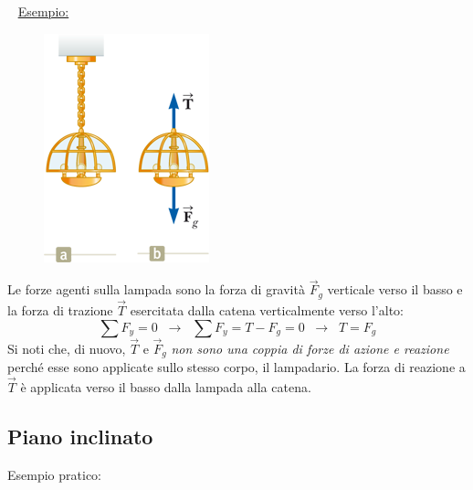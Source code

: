 \documentclass[12pt,oneside]{book}
\begin{document}
~\newline
\underline{Esempio: }
\begin{figure}[h]
    \centering
    \includegraphics[scale=1]{lampada_in_equilibrio}
\end{figure}
Le forze agenti sulla lampada sono la forza di gravità $\vec{F}_g$ verticale verso il basso e la forza di trazione $\vec{T}$ esercitata dalla catena verticalmente verso l'alto:
\begin{equation*}
    \sum F_y = 0 \;\; \rightarrow \;\; \sum F_y = T - F_g = 0 \;\; \rightarrow \;\; T = F_g
\end{equation*}
Si noti che, di nuovo, $\vec{T}$ e $\vec{F}_g$ \emph{non sono una coppia di forze di azione e reazione} perché esse sono applicate sullo stesso corpo, il lampadario.
La forza di reazione a $\vec{T}$  è applicata verso il basso dalla lampada alla catena.

\newpage
\subsection{Piano inclinato}
Esempio pratico:
\end{document}
